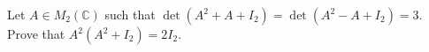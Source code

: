 Let $ A\in M_2\left( \mathbb{C}\right) $ such that $ \det \left( A^2+A+I_2\right) =\det \left( A^2-A+I_2\right) =3. $
Prove that $ A^2\left( A^2+I_2\right) =2I_2. $